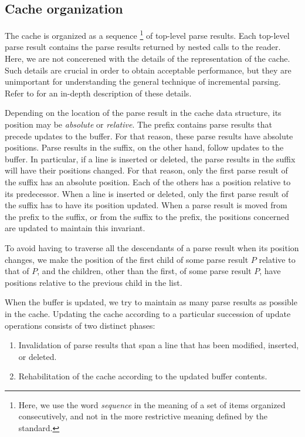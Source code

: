 \subsection{Cache organization}

The cache is organized as a sequence%
\footnote{Here, we use the word \emph{sequence} in the meaning of a
  set of items organized consecutively, and not in the more
  restrictive meaning defined by the \commonlisp{} standard.}  of
top-level parse results.  Each top-level parse result contains the
parse results returned by nested calls to the reader.  Here, we are
not concerened with the details of the representation of the cache.
Such details are crucial in order to obtain acceptable performance,
but they are unimportant for understanding the general technique of
incremental parsing.  Refer to  for an
in-depth description of these details.

Depending on the location of the parse result in the cache data
structure, its position may be \emph{absolute} or \emph{relative}.
The prefix contains parse results that precede updates to the buffer.
For that reason, these parse results have absolute positions.  Parse
results in the suffix, on the other hand, follow updates to the
buffer.  In particular, if a line is inserted or deleted, the parse
results in the suffix will have their positions changed.  For that
reason, only the first parse result of the suffix has an absolute
position.  Each of the others has a position relative to its
predecessor.  When a line is inserted or deleted, only the first parse
result of the suffix has to have its position updated.  When a parse
result is moved from the prefix to the suffix, or from the suffix to
the prefix, the positions concerned are updated to maintain this
invariant.

To avoid having to traverse all the descendants of a parse result when
its position changes, we make the position of the first child of some
parse result $P$ relative to that of $P$, and the children, other than
the first, of some parse result $P$, have positions relative to the
previous child in the list.

When the buffer is updated, we try to maintain as many parse results
as possible in the cache.  Updating the cache according to a
particular succession of update operations consists of two distinct
phases:

\begin{enumerate}
\item Invalidation of parse results that span a line that has been
  modified, inserted, or deleted.
\item Rehabilitation of the cache according to the updated buffer
  contents.
\end{enumerate}

